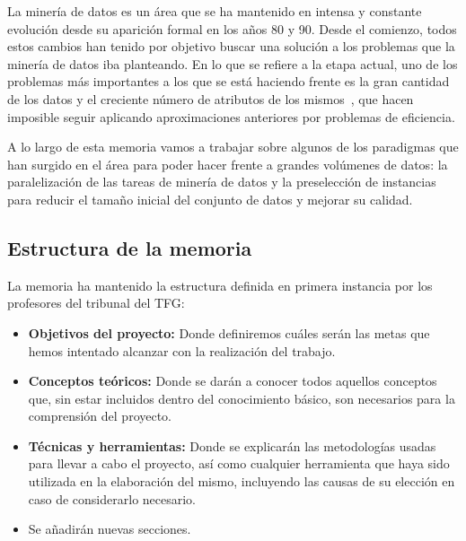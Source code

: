 \label{chap:Introduccion}


La minería de datos es un área que se ha mantenido en intensa y constante evolución desde su aparición formal en los años 80 y 90. Desde el comienzo, todos estos cambios han tenido por objetivo buscar una solución a los problemas que la minería de datos iba planteando. En lo que se refiere a la etapa actual, uno de los problemas más importantes a los que se está haciendo frente es la gran cantidad de los datos y el creciente número de atributos de los mismos~\cite{DataMiningConcepts}, que hacen imposible seguir aplicando aproximaciones anteriores por problemas de eficiencia.

A lo largo de esta memoria vamos a trabajar sobre algunos de los paradigmas que han surgido en el área para poder hacer frente a grandes volúmenes de datos: la paralelización de las tareas de minería de datos y la preselección de instancias para reducir el tamaño inicial del conjunto de datos y mejorar su calidad. 

\subsection{Estructura de la memoria}
	La memoria ha mantenido la estructura definida en primera instancia por los profesores del tribunal del TFG:
	\begin{itemize}
	\item \textbf{Objetivos del proyecto:} Donde definiremos cuáles serán las metas que hemos intentado alcanzar con la realización del trabajo.
	\item \textbf{Conceptos teóricos:} Donde se darán a conocer todos aquellos conceptos que, sin estar incluidos dentro del conocimiento básico, son necesarios para la comprensión del proyecto.
	\item \textbf{Técnicas y herramientas:} Donde se explicarán las metodologías usadas para llevar a cabo el proyecto, así como cualquier herramienta que haya sido utilizada en la elaboración del mismo, incluyendo las causas de su elección en caso de considerarlo necesario.
	\item Se añadirán nuevas secciones. 
	\end{itemize}

